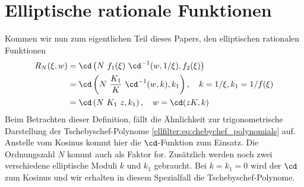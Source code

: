 \section{Elliptische rationale Funktionen}

Kommen wir nun zum eigentlichen Teil dieses Papers, den elliptischen rationalen Funktionen \cite{ellfilter:bib:orfanidis}
\begin{align}
    R_N(\xi, w) &= \cd \left(N~f_1(\xi)~\cd^{-1}(w, 1/\xi), f_2(\xi)\right) \label{ellfilter:eq:elliptic}\\
                &= \cd \left(N~\frac{K_1}{K}~\cd^{-1}(w, k), k_1\right) , \quad k= 1/\xi, k_1 = 1/f(\xi) \\
                &= \cd \left(N~K_1~z , k_1 \right), \quad w= \cd(z K, k)
\end{align}
Beim Betrachten dieser Definition, fällt die Ähnlichkeit zur trigonometrische Darstellung der Tsche\-byschef-Polynome \eqref{ellfilter:eq:chebychef_polynomials} auf.
Anstelle vom Kosinus kommt hier die $\cd$-Funktion zum Einsatz.
Die Ordnungszahl $N$ kommt auch als Faktor for.
Zusätzlich werden noch zwei verschiedene elliptische Moduli $k$ und $k_1$ gebraucht.
Bei $k = k_1 = 0$ wird der $\cd$ zum Kosinus und wir erhalten in diesem Spezialfall die Tschebyschef-Polynome.

